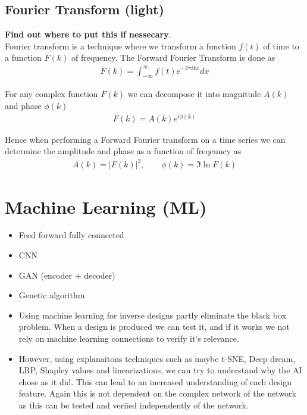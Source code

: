\section{Fourier Transform (light)}

\textbf{Find out where to put this if nessecary}. \\

Fourier transform is a technique where we transform a function $f(t)$ of time to
a function $F(k)$ of frequency. The Forward Fourier Transform is done as
\begin{align*}
  F(k) = \int_{-\infty}^\infty f(t) e^{-2\pi ikx} dx
\end{align*}

For any complex function $F(k)$ we can decompose it into magnitude $A(k)$ and
phase $\phi(k)$
\begin{align*}
  F(k) = A(k) e^{i \phi(k)}
\end{align*}

Hence when performing a Forward Fourier transform on a time series we can
determine the amplitude and phase as a function of freqeuncy as 
\begin{align*}
  A(k) = |F(k)|^2, \qquad \phi(k) = \Im{\ln{F(k)}}
\end{align*}






\chapter{Machine Learning (ML)}
\begin{itemize}
  \item Feed forward fully connected
  \item CNN
  \item GAN (encoder + decoder)
  \item Genetic algorithm
  \item Using machine learning for inverse designs partly eliminate the black
  box problem. When a design is produced we can test it, and if it works we not
  rely on machine learning connections to verify it's relevance. 
  \item However, using explanaitons techniques such as maybe t-SNE, Deep dream,
  LRP, Shapley values and linearizations, we can try to understand why the AI
  chose as it did. This can lead to an increased understanding of each design
  feature. Again this is not dependent on the complex network of the network as
  this can be tested and veriied independently of the network. 
\end{itemize}

